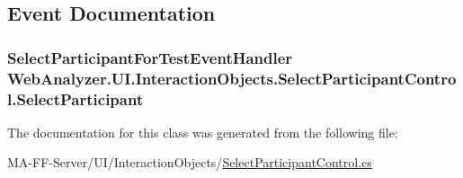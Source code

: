 \subsection{Event Documentation}
\hypertarget{class_web_analyzer_1_1_u_i_1_1_interaction_objects_1_1_select_participant_control_aed961b133694321fc9ba8bf431ade028}{}
\subsubsection[{Select\+Participant}]{\setlength{\rightskip}{0pt plus 5cm}Select\+Participant\+For\+Test\+Event\+Handler Web\+Analyzer.\+U\+I.\+Interaction\+Objects.\+Select\+Participant\+Control.\+Select\+Participant}\label{class_web_analyzer_1_1_u_i_1_1_interaction_objects_1_1_select_participant_control_aed961b133694321fc9ba8bf431ade028}


The documentation for this class was generated from the following file\+:\begin{DoxyCompactItemize}
\item 
M\+A-\/\+F\+F-\/\+Server/\+U\+I/\+Interaction\+Objects/\hyperlink{_select_participant_control_8cs}{Select\+Participant\+Control.\+cs}\end{DoxyCompactItemize}
